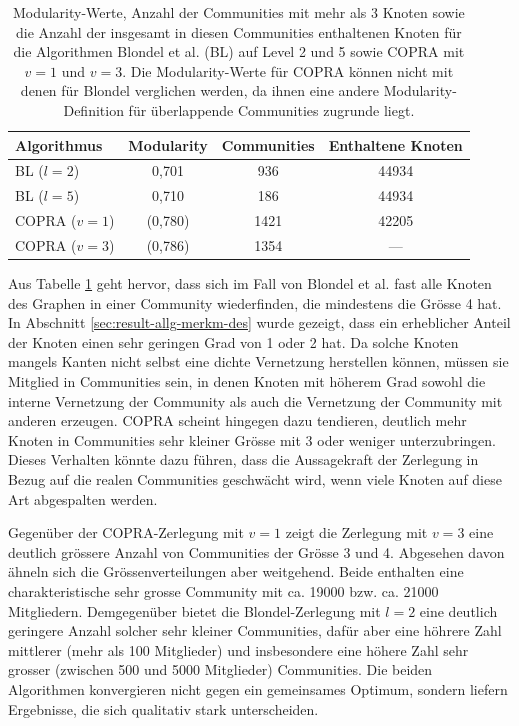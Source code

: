 \begin{table}[t]
  \centering
  \footnotesize
  \begin{tabular}{l|c|c|c}
    Algorithmus & Modularity & Communities &
    Enthaltene Knoten \\
    \hline
    BL ($l=2$)& 0,701 & 936 & 44934 \\
    BL ($l=5$)& 0,710 & 186 & 44934 \\
    \hline
    COPRA ($v=1$) & (0,780) & 1421 & 42205 \\
    COPRA ($v=3$) & (0,786) & 1354 & --- \\

  \end{tabular}
  \caption{Modularity-Werte, Anzahl der Communities mit mehr als 3
    Knoten sowie die Anzahl der insgesamt in diesen Communities enthaltenen
    Knoten 
    f\"ur die Algorithmen 
    Blondel et al. (BL) auf Level 2 und 5 sowie COPRA mit $v=1$ und
    $v=3$. Die
    Modularity-Werte f\"ur COPRA k\"onnen nicht mit denen f\"ur
    Blondel verglichen werden, da ihnen eine andere
    Modularity-Definition f\"ur \"uberlappende Communities zugrunde
    liegt.}
  \label{tab:mod-result}
\end{table}

Aus Tabelle \ref{tab:mod-result} geht hervor, dass sich im Fall von
Blondel et al. fast alle Knoten des Graphen in einer Community
wiederfinden, die mindestens die Gr\"osse 4 hat. In Abschnitt
\ref{sec:result-allg-merkm-des} wurde gezeigt, dass ein erheblicher
Anteil der Knoten einen sehr geringen Grad von 1 oder 2 hat. Da solche
Knoten mangels Kanten nicht selbst eine dichte Vernetzung herstellen
k\"onnen, m\"ussen sie Mitglied in Communities sein, in denen Knoten
mit h\"oherem Grad sowohl die interne Vernetzung der Community als
auch die Vernetzung der Community mit anderen erzeugen. COPRA scheint
hingegen dazu tendieren, deutlich mehr Knoten in Communities sehr
kleiner Gr\"osse mit 3 oder weniger unterzubringen. Dieses Verhalten
k\"onnte dazu f\"uhren, dass die Aussagekraft der Zerlegung in Bezug
auf die realen Communities geschw\"acht wird, wenn viele Knoten auf
diese Art abgespalten werden.

Gegen\"uber der COPRA-Zerlegung mit $v=1$ zeigt die Zerlegung mit
$v=3$ eine deutlich gr\"ossere Anzahl von Communities der Gr\"osse 3
und 4. Abgesehen davon \"ahneln sich die Gr\"ossenverteilungen aber
weitgehend. Beide enthalten eine charakteristische sehr grosse
Community mit ca. 19000 bzw. ca. 21000 Mitgliedern. Demgegen\"uber
bietet die Blondel-Zerlegung mit $l=2$ eine deutlich geringere Anzahl
solcher sehr kleiner Communities, daf\"ur aber eine h\"ohrere Zahl
mittlerer (mehr als 100 Mitglieder) und insbesondere eine h\"ohere
Zahl sehr grosser (zwischen 500 und 5000 Mitglieder) Communities.  Die
beiden Algorithmen konvergieren nicht gegen ein gemeinsames Optimum,
sondern liefern Ergebnisse, die sich qualitativ stark unterscheiden.

